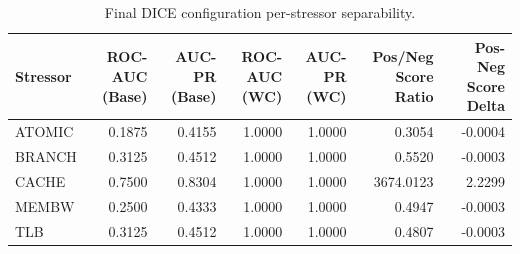 \begin{table}[t]
\centering
\caption{Final DICE configuration per-stressor separability.}
\label{tab:dice_full_stressor}
\footnotesize
\begin{tabular}{lrrrrrr}
\toprule
Stressor & ROC-AUC (Base) & AUC-PR (Base) & ROC-AUC (WC) & AUC-PR (WC) & Pos/Neg Score Ratio & Pos-Neg Score Delta \\
\midrule
ATOMIC & 0.1875 & 0.4155 & 1.0000 & 1.0000 & 0.3054 & -0.0004 \\
BRANCH & 0.3125 & 0.4512 & 1.0000 & 1.0000 & 0.5520 & -0.0003 \\
CACHE & 0.7500 & 0.8304 & 1.0000 & 1.0000 & 3674.0123 & 2.2299 \\
MEMBW & 0.2500 & 0.4333 & 1.0000 & 1.0000 & 0.4947 & -0.0003 \\
TLB & 0.3125 & 0.4512 & 1.0000 & 1.0000 & 0.4807 & -0.0003 \\
\bottomrule
\end{tabular}

\end{table}
